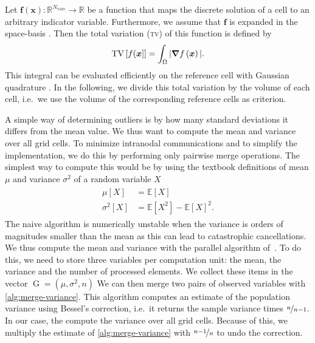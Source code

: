 Let $\bm{f}(\bm{x}): \mathbb{R}^{N_\text{vars}} \to \mathbb{R}$ be a function that maps the discrete solution of a cell to an arbitrary indicator variable.
Furthermore, we assume that $\bm{f}$ is expanded in the space-basis .
Then the total variation (\textsc{tv}) of this function is defined by
\newcommand{\tv}{\operatorname{TV}}
\begin{equation}
  \label{eq:tv}
  \tv \left[ f(\bm{x}] \right] =
\int_{\domain} \vert \gradient{f \left( \bm{x} \right)} \vert.
\end{equation}
This integral can be evaluated efficiently on the reference cell  with Gaussian quadrature .
In the following, we divide this total variation by the volume of each cell, i.e.\ we use the volume of the corresponding reference cells as criterion. 

\newcommand{\gobs}{\operatorname{G}}
\newcommand{\mean}{\mu}
\newcommand{\std}{\sigma}
\newcommand{\variance}{\std^2}
\newcommand{\gobsCount}{n}
A simple way of determining outliers is by how many standard deviations it differs from the mean value.
We thus want to compute the mean and variance over all grid cells.
To minimize intranodal communications and to simplify the implementation, we do this by performing only pairwise merge operations.
The simplest way to compute this would be by using the textbook definitions of mean $\mean$ and variance $\variance$ of a random variable $X$
\newcommand{\expectation}{\mathbb{E}}
\begin{align}
  \begin{split}
    \mean [X] &= \expectation \left[ X \right]\\
    \variance [X] &= \expectation \left[ X^2 \right] - \expectation \left[ X \right]^2.
  \end{split}
\end{align}
The naive algorithm is numerically unstable when the variance is orders of magnitudes smaller than the mean as this can lead to catastrophic cancellations.
We thus compute the mean and variance with the parallel algorithm of~\cite{chan1982updating}.
To do this, we need to store three variables per computation unit:
the mean, the variance and the number of processed elements.
We collect these items in the vector $\gobs = (\mean, \variance, \gobsCount)$
We can then merge two pairs of observed variables with \cref{alg:merge-variance}.
This algorithm computes an estimate of the population variance using Bessel's correction, i.e.\ it returns the sample variance times $\nicefrac{n}{n-1}$.
In our case, the compute the variance over all grid cells.
Because of this, we multiply the estimate of \cref{alg:merge-variance} with $\nicefrac{n-1}{n}$ to undo the correction.

